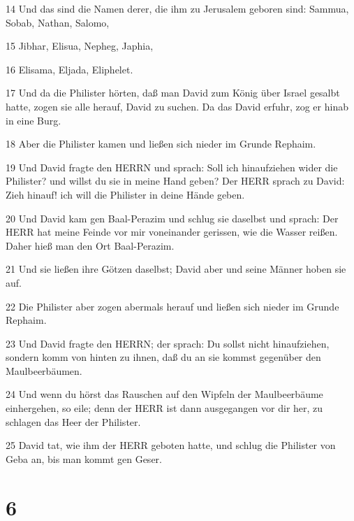 \par 14 Und das sind die Namen derer, die ihm zu Jerusalem geboren sind: Sammua, Sobab, Nathan, Salomo,
\par 15 Jibhar, Elisua, Nepheg, Japhia,
\par 16 Elisama, Eljada, Eliphelet.
\par 17 Und da die Philister hörten, daß man David zum König über Israel gesalbt hatte, zogen sie alle herauf, David zu suchen. Da das David erfuhr, zog er hinab in eine Burg.
\par 18 Aber die Philister kamen und ließen sich nieder im Grunde Rephaim.
\par 19 Und David fragte den HERRN und sprach: Soll ich hinaufziehen wider die Philister? und willst du sie in meine Hand geben? Der HERR sprach zu David: Zieh hinauf! ich will die Philister in deine Hände geben.
\par 20 Und David kam gen Baal-Perazim und schlug sie daselbst und sprach: Der HERR hat meine Feinde vor mir voneinander gerissen, wie die Wasser reißen. Daher hieß man den Ort Baal-Perazim.
\par 21 Und sie ließen ihre Götzen daselbst; David aber und seine Männer hoben sie auf.
\par 22 Die Philister aber zogen abermals herauf und ließen sich nieder im Grunde Rephaim.
\par 23 Und David fragte den HERRN; der sprach: Du sollst nicht hinaufziehen, sondern komm von hinten zu ihnen, daß du an sie kommst gegenüber den Maulbeerbäumen.
\par 24 Und wenn du hörst das Rauschen auf den Wipfeln der Maulbeerbäume einhergehen, so eile; denn der HERR ist dann ausgegangen vor dir her, zu schlagen das Heer der Philister.
\par 25 David tat, wie ihm der HERR geboten hatte, und schlug die Philister von Geba an, bis man kommt gen Geser.

\chapter{6}

